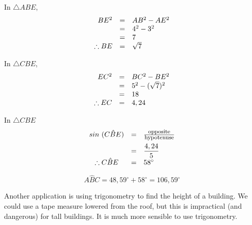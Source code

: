 \begin{wex}
{
In $\triangle ABE$, \\
\begin{equation*}
\begin{array}{ccl}
 \hfill BE^{2} &=& AB^{2} - AE^{2} \hfill \\
\hfill &=& 4^{2} - 3^{2} \hfill \\
\hfill &=&7\\
\therefore BE &=& \sqrt{7}
\end{array}
\end{equation*}

In $\triangle CBE$, \\

\begin{equation*}
\begin{array}{ccl}
 \hfill EC^{2} &=& BC^{2} - BE^{2} \hfill \\
\hfill &=& 5^{2} - (\sqrt{7})^{2} \hfill \\
\hfill &=& 18 \hfill \\
\therefore EC &=& 4,24 \hfill
\end{array}
\end{equation*}

In $\triangle CBE$ 
\begin{equation*}
\begin{array}{ccl}\hfill sin~(C\hat{B}E)& =& \frac{\mbox{\footnotesize opposite}}{\mbox{\footnotesize hypotenuse}}\hfill \vspace{5pt}\\
 \hfill & =& \dfrac{4,24}{5}\hfill \\
 \therefore C\hat{B}E& =& {58}^{\circ }\hfill 
\end{array}
\end{equation*}

\begin{equation*}
A\hat{B}C = 48,59^{\circ} + 58^{\circ} = 106,59^{\circ}
\end{equation*}
}
\end{wex}



  
Another application is using trigonometry to find the height of a building. We could use a tape measure lowered from the roof, but this is impractical (and dangerous) for tall buildings. It is much more sensible to use trigonometry.\par 

